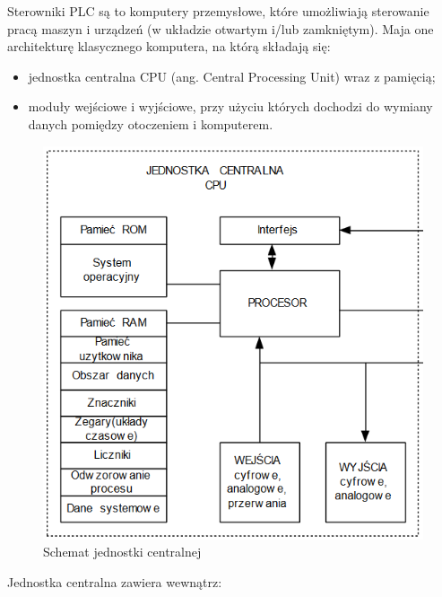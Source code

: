 \documentclass{article}
\begin{document}
	Sterowniki PLC są to komputery przemysłowe, które umożliwiają sterowanie pracą maszyn i urządzeń (w układzie otwartym i/lub zamkniętym). Maja one architekturę klasycznego komputera, na którą składają się:
	
	\begin{itemize}
		
	\item jednostka centralna CPU (ang. Central Processing Unit) wraz z pamięcią;
	
	\item moduły wejściowe i wyjściowe, przy użyciu których dochodzi do wymiany danych pomiędzy otoczeniem i komputerem.
	
	\end{itemize}
	
	\begin{figure}[!htb]
		\centering
		\includegraphics[width=0.7\linewidth]{cpu}
		\caption{Schemat jednostki centralnej}
		\label{fig:cpu}
	\end{figure}
	
	Jednostka centralna zawiera wewnątrz:
	
\end{document}

